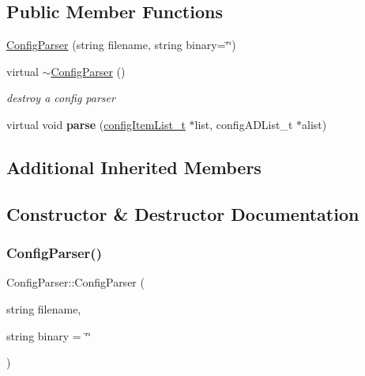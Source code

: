 \subsection*{Public Member Functions}
\begin{DoxyCompactItemize}
\item 
\hyperlink{classConfigParser_aa514906626a6eaa9872320410e4ab79c}{Config\+Parser} (string filename, string binary=\char`\"{}\char`\"{})
\item 
\mbox{\label{classConfigParser_a610d3e5316be803c8f1bb7eebe32504b}} 
virtual \hyperlink{classConfigParser_a610d3e5316be803c8f1bb7eebe32504b}{$\sim$\+Config\+Parser} ()
\begin{DoxyCompactList}\small\item\em destroy a config parser \end{DoxyCompactList}\item 
\mbox{\label{classConfigParser_a4bc04924569bb6a49bfb8792e8421810}} 
virtual void {\bfseries parse} (\hyperlink{classconfigItemList__t}{config\+Item\+List\+\_\+t} $\ast$list, config\+A\+D\+List\+\_\+t $\ast$alist)
\end{DoxyCompactItemize}
\subsection*{Additional Inherited Members}


\subsection{Constructor \& Destructor Documentation}
\mbox{\label{classConfigParser_aa514906626a6eaa9872320410e4ab79c}} 
\subsubsection{\texorpdfstring{Config\+Parser()}{ConfigParser()}}
{\footnotesize\ttfamily Config\+Parser\+::\+Config\+Parser (\begin{DoxyParamCaption}\item[{string}]{filename,  }\item[{string}]{binary = {\ttfamily \char`\"{}\char`\"{}} }\end{DoxyParamCaption})}

